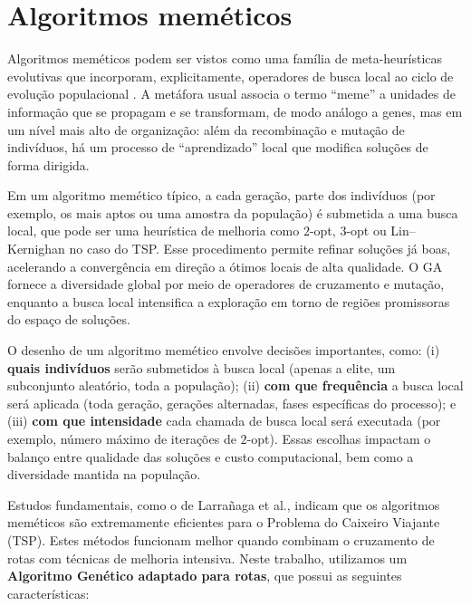 \section{Algoritmos meméticos}\label{sec-25-algoritmos-memeticos}

Algoritmos meméticos podem ser vistos como uma família de
meta-heurísticas evolutivas que incorporam, explicitamente, operadores
de busca local ao ciclo de evolução populacional
\autocite{larranaga1999genetic}. A metáfora usual associa o termo
``meme'' a unidades de informação que se propagam e se transformam, de
modo análogo a genes, mas em um nível mais alto de organização: além da
recombinação e mutação de indivíduos, há um processo de ``aprendizado''
local que modifica soluções de forma dirigida.

Em um algoritmo memético típico, a cada geração, parte dos indivíduos
(por exemplo, os mais aptos ou uma amostra da população) é submetida a
uma busca local, que pode ser uma heurística de melhoria como \(2\)-opt,
\(3\)-opt ou Lin--Kernighan no caso do TSP. Esse procedimento permite
refinar soluções já boas, acelerando a convergência em direção a ótimos
locais de alta qualidade. O GA fornece a diversidade global por meio de
operadores de cruzamento e mutação, enquanto a busca local intensifica a
exploração em torno de regiões promissoras do espaço de soluções.

O desenho de um algoritmo memético envolve decisões importantes, como:
(i) \textbf{quais indivíduos} serão submetidos à busca local (apenas a
elite, um subconjunto aleatório, toda a população); (ii) \textbf{com que
  frequência} a busca local será aplicada (toda geração, gerações
alternadas, fases específicas do processo); e (iii) \textbf{com que
  intensidade} cada chamada de busca local será executada (por exemplo,
número máximo de iterações de \(2\)-opt). Essas escolhas impactam o
balanço entre qualidade das soluções e custo computacional, bem como a
diversidade mantida na população.

Estudos fundamentais, como o de Larrañaga et al., indicam que os
algoritmos meméticos são extremamente eficientes para o Problema do
Caixeiro Viajante (TSP). Estes métodos funcionam melhor quando combinam
o cruzamento de rotas com técnicas de melhoria intensiva. Neste
trabalho, utilizamos um \textbf{Algoritmo Genético adaptado para rotas},
que possui as seguintes características:

